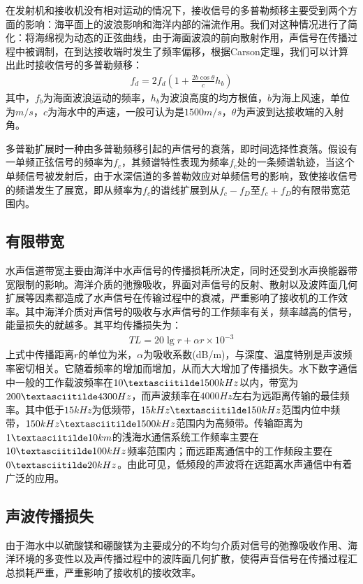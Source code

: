 在发射机和接收机没有相对运动的情况下，接收信号的多普勒频移主要受到两个方面的影响：海平面上的波浪影响和海洋内部的湍流作用。我们对这种情况进行了简化：将海绵视为动态的正弦曲线，由于海面波浪的前向散射作用，声信号在传播过程中被调制，在到达接收端时发生了频率偏移，根据Carson定理，我们可以计算出此时接收信号的多普勒频移：
\begin{eqnarray}
    f_d=2f_d\left(1+\frac{2b\cos\theta}{c}h_b\right)
    \label{equ:2.5}
\end{eqnarray}
其中，$f_b$为海面波浪运动的频率，$h_b$为波浪高度的均方根值，$b$为海上风速，单位为$m/s$，$c$为海水中的声速，一般可认为是$1500m/s$，$\theta$为声波到达接收端的入射角。

多普勒扩展时一种由多普勒频移引起的声信号的衰落，即时间选择性衰落。假设有一单频正弦信号的频率为$f_c$，其频谱特性表现为频率$f_c$处的一条频谱轨迹，当这个单频信号被发射后，由于水深信道的多普勒效应对单频信号的影响，致使接收信号的频谱发生了展宽，即从频率为$f_c$的谱线扩展到从$f_c-f_D$至$f_c+f_D$的有限带宽范围内。
\subsection{有限带宽}
水声信道带宽主要由海洋中水声信号的传播损耗所决定，同时还受到水声换能器带宽限制的影响。海洋介质的弛豫吸收\citep{Essebbar1994}，界面对声信号的反射、散射以及波阵面几何扩展等因素都造成了水声信号在传输过程中的衰减，严重影响了接收机的工作效率。其中海洋介质对声信号的吸收与水声信号的工作频率有关，频率越高的信号，能量损失的就越多。其平均传播损失为：
\begin{eqnarray}
    TL=20\lg r+\alpha r\times10^{-3}
    \label{equ:2.6}
\end{eqnarray}
上式中传播距离$r$的单位为米，$\alpha$为吸收系数(dB/m)，与深度、温度特别是声波频率密切相关。它随着频率的增加而增加，从而大大增加了传播损失。水下数字通信中一般的工作载波频率在$10\textasciitilde
1500kHz$以内，带宽为$200\textasciitilde
4300Hz$，而声波频率在$4000Hz$左右为远距离传输的最佳频率。其中低于$15kHz$为低频带，$15kHz\textasciitilde
150kHz$范围内位中频带，$150kHz\textasciitilde
1500kHz$范围内为高频带。传输距离为$1\textasciitilde10km$的浅海水通信系统工作频率主要在$10\textasciitilde 100kHz$频率范围内；而远距离通信中的工作频段主要在$0\textasciitilde
20kHz$。由此可见，低频段的声波将在远距离水声通信中有着广泛的应用。
\subsection{声波传播损失}
由于海水中以硫酸镁和硼酸镁为主要成分的不均匀介质对信号的弛豫吸收作用、海洋环境的多变性以及声传播过程中的波阵面几何扩散，使得声音信号在传播过程汇总损耗严重，严重影响了接收机的接收效率。


